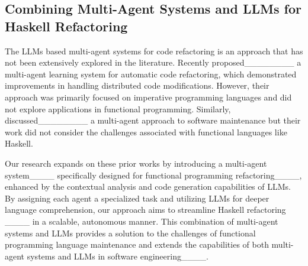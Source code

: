 \subsection{Combining Multi-Agent Systems and LLMs for Haskell Refactoring}

The LLMs based multi-agent systems for code refactoring is an approach that has not been extensively explored in the literature. Recently proposed________ a multi-agent learning system for automatic code refactoring, which demonstrated improvements in handling distributed code modifications. However, their approach was primarily focused on imperative programming languages and did not explore applications in functional programming. Similarly, discussed________ a multi-agent approach to software maintenance but their work did not consider the challenges associated with functional languages like Haskell.

Our research expands on these prior works by introducing a multi-agent system____ specifically designed for functional programming refactoring____, enhanced by the contextual analysis and code generation capabilities of LLMs. By assigning each agent a specialized task and utilizing LLMs for deeper language comprehension, our approach aims to streamline Haskell refactoring ____ in a scalable, autonomous manner. This combination of multi-agent systems and LLMs provides a solution to the challenges of functional programming language maintenance and extends the capabilities of both multi-agent systems and LLMs in software engineering____.